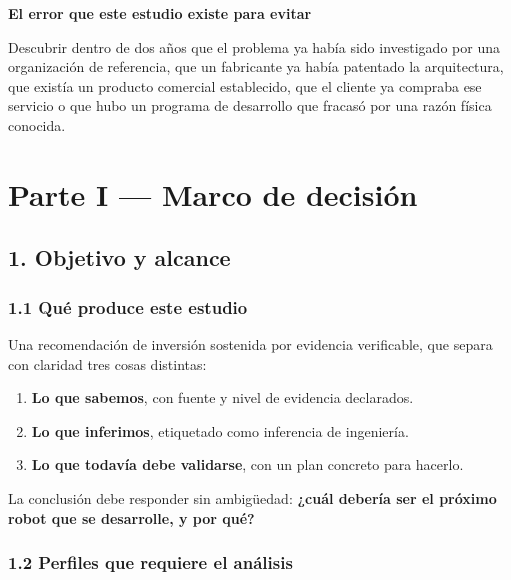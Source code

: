 \documentclass[11pt,a4paper]{article}
\newenvironment{notariesgo}[1]
  {\begin{notariesgobase}{\sffamily\scriptsize\bfseries\color{red}#1}\par\vspace{2pt}}
  {\end{notariesgobase}}
\begin{document}
\begin{notariesgo}{El error que este estudio existe para evitar}
Descubrir dentro de dos años que el problema ya había sido investigado por una organización de referencia, que un fabricante ya había patentado la arquitectura, que existía un producto comercial establecido, que el cliente ya compraba ese servicio o que hubo un programa de desarrollo que fracasó por una razón física conocida.

\end{notariesgo}
\clearpage

\section*{Parte I — Marco de decisión}


\subsection*{1. Objetivo y alcance}


\subsubsection*{1.1 Qué produce este estudio}

Una recomendación de inversión sostenida por evidencia verificable, que separa con claridad tres cosas distintas:

\begin{enumerate}
\item \textbf{Lo que sabemos}, con fuente y nivel de evidencia declarados.
\item \textbf{Lo que inferimos}, etiquetado como inferencia de ingeniería.
\item \textbf{Lo que todavía debe validarse}, con un plan concreto para hacerlo.
\end{enumerate}

La conclusión debe responder sin ambigüedad: \textbf{¿cuál debería ser el próximo robot que se desarrolle, y por qué?}


\subsubsection*{1.2 Perfiles que requiere el análisis}
\end{document}
